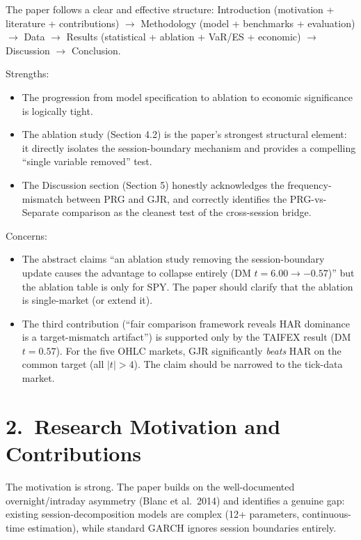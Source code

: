 \documentclass[12pt,a4paper]{article}
\begin{document}
The paper follows a clear and effective structure: Introduction (motivation + literature + contributions) $\to$ Methodology (model + benchmarks + evaluation) $\to$ Data $\to$ Results (statistical + ablation + VaR/ES + economic) $\to$ Discussion $\to$ Conclusion.

\textcolor{okgreen}{Strengths:}
\begin{itemize}[nosep]
\item The progression from model specification to ablation to economic significance is logically tight.
\item The ablation study (Section 4.2) is the paper's strongest structural element: it directly isolates the session-boundary mechanism and provides a compelling ``single variable removed'' test.
\item The Discussion section (Section 5) honestly acknowledges the frequency-mismatch between PRG and GJR, and correctly identifies the PRG-vs-Separate comparison as the cleanest test of the cross-session bridge.
\end{itemize}

\textcolor{warncolor}{Concerns:}
\begin{itemize}[nosep]
\item The abstract claims ``an ablation study removing the session-boundary update causes the advantage to collapse entirely (DM $t = 6.00 \to -0.57$)'' but the ablation table is only for SPY. The paper should clarify that the ablation is single-market (or extend it).
\item The third contribution (``fair comparison framework reveals HAR dominance is a target-mismatch artifact'') is supported only by the TAIFEX result (DM $t = 0.57$). For the five OHLC markets, GJR significantly \emph{beats} HAR on the common target (all $|t| > 4$). The claim should be narrowed to the tick-data market.
\end{itemize}


\section*{2.\ Research Motivation and Contributions}

\textcolor{okgreen}{The motivation is strong.} The paper builds on the well-documented overnight/intraday asymmetry (Blanc et al.\ 2014) and identifies a genuine gap: existing session-decomposition models are complex (12+ parameters, continuous-time estimation), while standard GARCH ignores session boundaries entirely.
\end{document}
